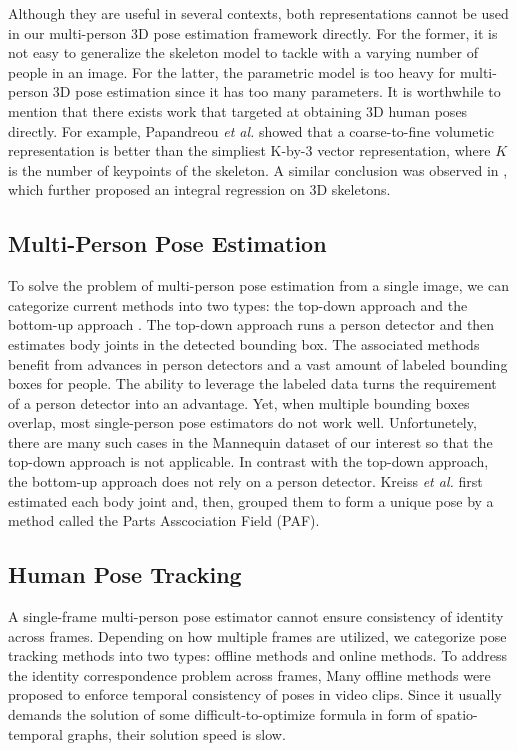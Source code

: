 \documentclass{article}
\begin{document}
Although they are useful in several contexts, both representations
cannot be used in our multi-person 3D pose estimation framework
directly. For the former, it is not easy to generalize the skeleton
model to tackle with a varying number of people in an image. For the
latter, the parametric model is too heavy for multi-person 3D pose
estimation since it has too many parameters.  It is worthwhile to
mention that there exists work that targeted at obtaining 3D human poses
directly.  For example, Papandreou {\em et al.}
\cite{papandreou2017towards} showed that a coarse-to-fine volumetic
representation is better than the simpliest K-by-3 vector
representation, where $K$ is the number of keypoints of the skeleton.  A
similar conclusion was observed in \cite{sun2018integral}, which further
proposed an integral regression on 3D skeletons. 

\subsection{Multi-Person Pose Estimation} 

To solve the problem of multi-person pose estimation from a single
image, we can categorize current methods into two types: the top-down
approach \cite{papandreou2017towards,he2017mask,toshev2014deeppose,
wei2019view, ning2017knowledge,yu2017monocular,xu2020multi} and the bottom-up
approach \cite{kreiss2019pifpaf,cao2017realtime}. The top-down approach
runs a person detector and then estimates body joints in the detected
bounding box. The associated methods benefit from advances in person
detectors and a vast amount of labeled bounding boxes for people.  The
ability to leverage the labeled data turns the requirement of a person
detector into an advantage. Yet, when multiple bounding boxes overlap,
most single-person pose estimators do not work well. Unfortunetely,
there are many such cases in the Mannequin dataset of our interest so
that the top-down approach is not applicable. In contrast with the
top-down approach, the bottom-up approach does not rely on a person
detector.  Kreiss {\em et al.} \cite{kreiss2019pifpaf} first estimated
each body joint and, then, grouped them to form a unique pose by a
method called the Parts Asscociation Field (PAF). 

\subsection{Human Pose Tracking} 

A single-frame multi-person pose estimator cannot ensure consistency of
identity across frames. Depending on how multiple frames are utilized,
we categorize pose tracking methods into two types: offline methods and
online methods. To address the identity correspondence problem across
frames, Many offline methods \cite{insafutdinov2017arttrack,
iqbal2017posetrack, xiao2018simple, zhang2014robust} were proposed to
enforce temporal consistency of poses in video clips. Since it usually
demands the solution of some difficult-to-optimize formula in form of
spatio-temporal graphs, their solution speed is slow. 
\end{document}
